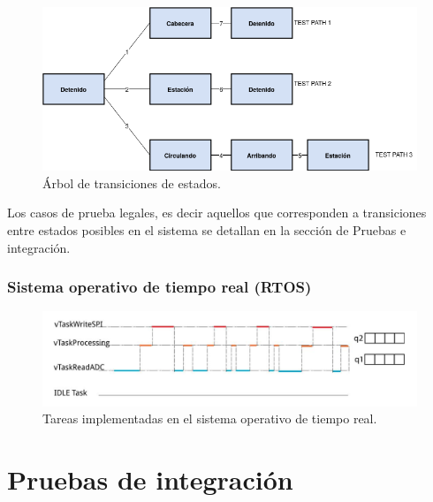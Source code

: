 \documentclass[
11pt, %
]{charter}
\begin{document}
\begin{figure}[htpb]
\centering 
\includegraphics[width=1\textwidth]{./Pics/STT.Tree.png}
\caption{Árbol de transiciones de estados.}
\label{fig:State tree}
\end{figure}

Los casos de prueba legales, es decir aquellos que corresponden a
transiciones entre estados posibles en el sistema se detallan en la sección de Pruebas e integración.





\pagebreak
\subsubsection{Sistema operativo de tiempo real (RTOS)}

\begin{figure}[htpb]
\centering 
\includegraphics[width=1\textwidth]{./Pics/RTOS.tasks.png}
\caption{Tareas implementadas en el sistema operativo de tiempo real.}
\label{fig:RTOS tasks}
\end{figure}

\pagebreak
\section{Pruebas de integración}
\end{document}
